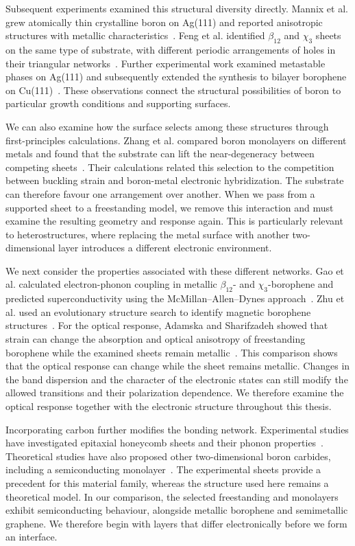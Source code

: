Subsequent experiments examined this structural diversity directly.
Mannix et al. grew atomically thin crystalline boron on Ag(111) and reported anisotropic structures with metallic characteristics~\cite{mannix2015synthesis}.
Feng et al. identified $\beta_{12}$ and $\chi_3$ sheets on the same type of substrate, with different periodic arrangements of holes in their triangular networks~\cite{feng2016experimental}.
Further experimental work examined metastable phases on Ag(111) and subsequently extended the synthesis to bilayer borophene on Cu(111)~\cite{zhong2017metastable,chen2022synthesis}.
These observations connect the structural possibilities of boron to particular growth conditions and supporting surfaces.

We can also examine how the surface selects among these structures through first-principles calculations.
Zhang et al. compared boron monolayers on different metals and found that the substrate can lift the near-degeneracy between competing sheets~\cite{zhang2015monolayers}.
Their calculations related this selection to the competition between buckling strain and boron-metal electronic hybridization.
The substrate can therefore favour one arrangement over another.
When we pass from a supported sheet to a freestanding model, we remove this interaction and must examine the resulting geometry and response again.
This is particularly relevant to heterostructures, where replacing the metal surface with another two-dimensional layer introduces a different electronic environment.

We next consider the properties associated with these different networks.
Gao et al. calculated electron-phonon coupling in metallic $\beta_{12}$- and $\chi_3$-borophene and predicted superconductivity using the McMillan--Allen--Dynes approach~\cite{gao2017prediction}.
Zhu et al. used an evolutionary structure search to identify magnetic borophene structures~\cite{zhu2019magnetic}.
For the optical response, Adamska and Sharifzadeh showed that strain can change the absorption and optical anisotropy of freestanding borophene while the examined sheets remain metallic~\cite{adamska2017}.
This comparison shows that the optical response can change while the sheet remains metallic.
Changes in the band dispersion and the character of the electronic states can still modify the allowed transitions and their polarization dependence.
We therefore examine the optical response together with the electronic structure throughout this thesis.

Incorporating carbon further modifies the bonding network.
Experimental studies have investigated epitaxial  honeycomb sheets and their phonon properties~\cite{yanagisawa2004phonon,tanaka2005novel,yanagisawa2006phonon}.
Theoretical studies have also proposed other two-dimensional boron carbides, including a semiconducting  monolayer~\cite{tian2019}.
The experimental  sheets provide a precedent for this material family, whereas the  structure used here remains a theoretical model.
In our comparison, the selected freestanding  and  monolayers exhibit semiconducting behaviour, alongside metallic borophene and semimetallic graphene.
We therefore begin with layers that differ electronically before we form an interface.

